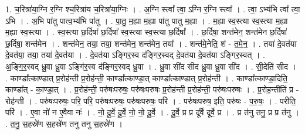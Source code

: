 \documentclass[17pt]{extarticle}
\begin{document}
1. च॒रित्रा॑या॒ग्नि र॒ग्नि श्च॒रित्रा॑य च॒रित्रा॑या॒ग्निः । . अ॒ग्नि स्त्वा᳚ त्वा॒ ऽग्नि र॒ग्नि स्त्वा᳚ । . त्वा॒ ऽभ्य॑भि त्वा᳚ त्वा॒ ऽभि । . अ॒भि पा॑तु पात्व॒भ्य॑भि पा॑तु । . पा॒तु॒ म॒ह्या म॒ह्या पा॑तु पातु म॒ह्या । . म॒ह्या स्व॒स्त्या स्व॒स्त्या म॒ह्या म॒ह्या स्व॒स्त्या । . स्व॒स्त्या छ॒र्दिषा॑ छ॒र्दिषा᳚ स्व॒स्त्या स्व॒स्त्या छ॒र्दिषा᳚ । . छ॒र्दिषा॒ शन्त॑मेन॒ शन्त॑मेन छ॒र्दिषा॑ छ॒र्दिषा॒ शन्त॑मेन । . शन्त॑मेन॒ तया॒ तया॒ शन्त॑मेन॒ शन्त॑मेन॒ तया᳚ । . शन्त॑मे॒नेति॒ शं - त॒मे॒न॒ । . तया॑ दे॒वत॑या दे॒वत॑या॒ तया॒ तया॑ दे॒वत॑या । . दे॒वत॑या ऽङ्गिर॒स्व द॑ङ्गिर॒स्वद् दे॒वत॑या दे॒वत॑या ऽङ्गिर॒स्वत् । . अ॒ङ्गि॒र॒स्वद् ध्रु॒वा ध्रु॒वा ऽङ्गि॑र॒स्व द॑ङ्गिर॒स्वद् ध्रु॒वा । . ध्रु॒वा सी॑द सीद ध्रु॒वा ध्रु॒वा सी॑द । . सी॒देति॑ सीद । . काण्डा᳚त्काण्डात् प्र॒रोह॑न्ती प्र॒रोह॑न्ती॒ काण्डा᳚त्काण्डा॒त् काण्डा᳚त्काण्डात् प्र॒रोह॑न्ती । . काण्डा᳚त्काण्डा॒दिति॒ काण्डा᳚त् - का॒ण्डा॒त् । . प्र॒रोह॑न्ती॒ परु॑षःपरुषः॒ परु॑षःपरुषः प्र॒रोह॑न्ती प्र॒रोह॑न्ती॒ परु॑षःपरुषः । . प्र॒रोह॒न्तीति॑ प्र - रोह॑न्ती । . परु॑षःपरुषः॒ परि॒ परि॒ परु॑षःपरुषः॒ परु॑षःपरुषः॒ परि॑ । . परु॑षःपरुष॒ इति॒ परु॑षः - प॒रु॒षः॒ । . परीति॒ परि॑ । . ए॒वा नो॑ न ए॒वैवा नः॑ । . नो॒ दू॒र्वे॒ दू॒र्वे॒ नो॒ नो॒ दू॒र्वे॒ । . दू॒र्वे॒ प्र प्र दू᳚र्वे दूर्वे॒ प्र । . प्र त॑नु तनु॒ प्र प्र त॑नु । . त॒नु॒ स॒हस्रे॑ण स॒हस्रे॑ण तनु तनु स॒हस्रे॑ण । \newline
\end{document}
